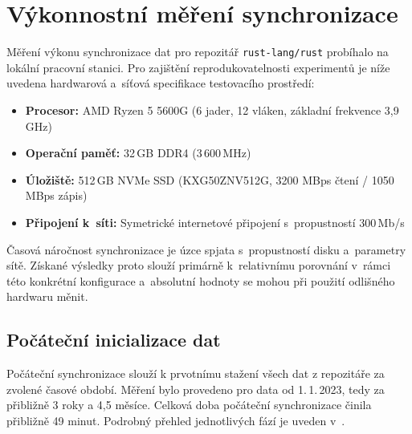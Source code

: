 \section{Výkonnostní měření synchronizace}
\label{sec:evaluace:benchmarks}

Měření výkonu synchronizace dat pro repozitář \texttt{rust-lang/rust} probíhalo na lokální pracovní stanici. Pro zajištění reprodukovatelnosti experimentů je níže uvedena hardwarová a~síťová specifikace testovacího prostředí:

\begin{itemize}
  \item \textbf{Procesor:} AMD Ryzen 5 5600G (6 jader, 12 vláken, základní frekvence 3,9\,GHz)
  \item \textbf{Operační paměť:} 32\,GB DDR4 (3\,600\,MHz)
  \item \textbf{Úložiště:} 512\,GB NVMe SSD (KXG50ZNV512G, 3200 MBps čtení / 1050 MBps zápis)
  \item \textbf{Připojení k~síti:} Symetrické internetové připojení s~propustností 300\,Mb/s
\end{itemize}

Časová náročnost synchronizace je úzce spjata s~propustností disku a~parametry sítě. Získané výsledky proto slouží primárně k~relativnímu porovnání v~rámci této konkrétní konfigurace a~absolutní hodnoty se mohou při použití odlišného hardwaru měnit.

\subsection{Počáteční inicializace dat}
\label{sec:evaluace:benchmarks:inicializace}

Počáteční synchronizace slouží k prvotnímu stažení všech dat z repozitáře za zvolené časové období.
Měření bylo provedeno pro data od 1.\,1.\,2023, tedy za přibližně 3 roky a 4,5 měsíce.
Celková doba počáteční synchronizace činila přibližně 49 minut.
Podrobný přehled jednotlivých fází je uveden v~.

